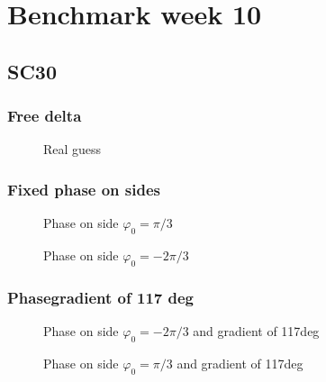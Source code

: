\documentclass[../main.tex]{subfiles}
\begin{document}
\section{Benchmark week 10}
\subsection{SC30}
\subsubsection{Free delta}
\begin{figure}[H]
    
    \caption{Real guess}
\end{figure}
\subsubsection{Fixed phase on sides}
\begin{figure}[H]
    
    \caption{Phase on side $\varphi_0 = \pi/3$}
\end{figure}
\begin{figure}[H]
    
    \caption{Phase on side $\varphi_0 = -2\pi/3$}
\end{figure}

\subsubsection{Phasegradient of 117 deg}
\begin{figure}[H]
    
    \caption{Phase on side $\varphi_0 = -2\pi/3$ and gradient of 117deg}
\end{figure}
\begin{figure}[H]
    
    \caption{Phase on side $\varphi_0 = \pi/3$ and gradient of 117deg}
\end{figure}
\end{document}
